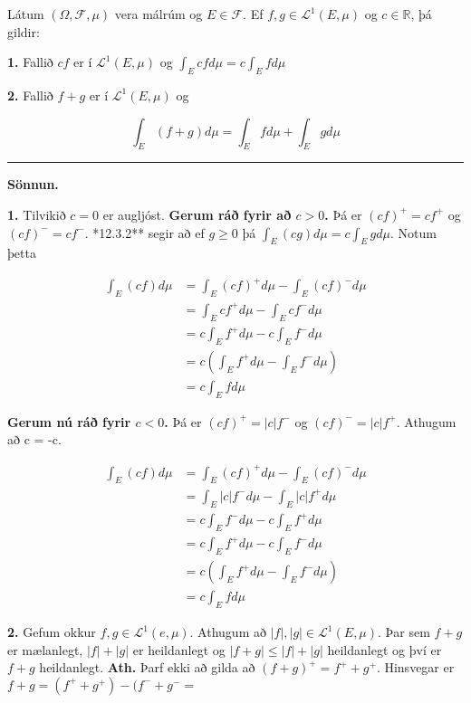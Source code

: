 \documentclass[]{book}
\begin{document}
Látum \((\Omega, \mathcal F, \mu)\) vera málrúm og \(E\in \mathcal F\). Ef \(f, g\in \mathcal L^1(E,\mu)\) og \(c\in\mathbb R\), þá gildir:

\textbf{1.} Fallið \(cf\) er í \(\mathcal L^1(E,\mu)\) og \(\int_E cfd\mu = c\int_Efd\mu\)

\textbf{2.} Fallið \(f + g\) er í \(\mathcal L^1(E,\mu)\) og

\[
\int_E(f+g)d\mu = \int_Efd\mu + \int_Egd\mu
\]

\begin{center}\rule{0.5\linewidth}{\linethickness}\end{center}

\textbf{Sönnun.}

\textbf{1.} Tilvikið \(c=0\) er augljóst. \textbf{Gerum ráð fyrir að \(c>0\).} Þá er \((cf)^+ = cf^+\) og \((cf)^- = cf^-\). *12.3.2** segir að ef \(g\geq0\) þá \(\int_E(cg)d\mu = c\int_E gd\mu\). Notum þetta

\[
\begin{aligned}
\int_E(cf)d\mu &= \int_E(cf)^+d\mu - \int_E(cf)^-d\mu \\
&= \int_E cf^+d\mu - \int_E cf^- d\mu \\
&= c\int_E f^+d\mu - c\int_E f^-d\mu \\
&= c(\int_Ef^+d\mu - \int_Ef^-d\mu) \\
&= c\int_Efd\mu
\end{aligned}
\]

\textbf{Gerum nú ráð fyrir \(c<0\).} Þá er \((cf)^+ = |c|f^-\) og \((cf)^- = |c|f^+\). Athugum að \textbar{}c\textbar{} = -c.

\[
\begin{aligned}
\int_E(cf)d\mu &= \int_E(cf)^+d\mu - \int_E(cf)^-d\mu \\
&= \int_E |c|f^-d\mu - \int_E |c|f^+ d\mu \\
&= c\int_E f^-d\mu - c\int_E f^+d\mu \\
&= c\int_E f^+d\mu - c\int_E f^-d\mu \\
&= c(\int_Ef^+d\mu - \int_Ef^-d\mu) \\
&= c\int_Efd\mu
\end{aligned}
\]

\textbf{2.} Gefum okkur \(f,g\in\mathcal L^1(e,\mu)\). Athugum að \(|f|, |g| \in\mathcal L^1(E,\mu)\). Þar sem \(f+g\) er mælanlegt, \(|f| + |g|\) er heildanlegt og \(|f+g| \leq |f| + |g|\) heildanlegt og því er \(f+g\) heildanlegt. \textbf{Ath.} Þarf ekki að gilda að \((f+g)^+ = f^+ + g^+\). Hinsvegar er \(f+g = (f^+ + g^+) - (f^- + g^-=\)
\end{document}
